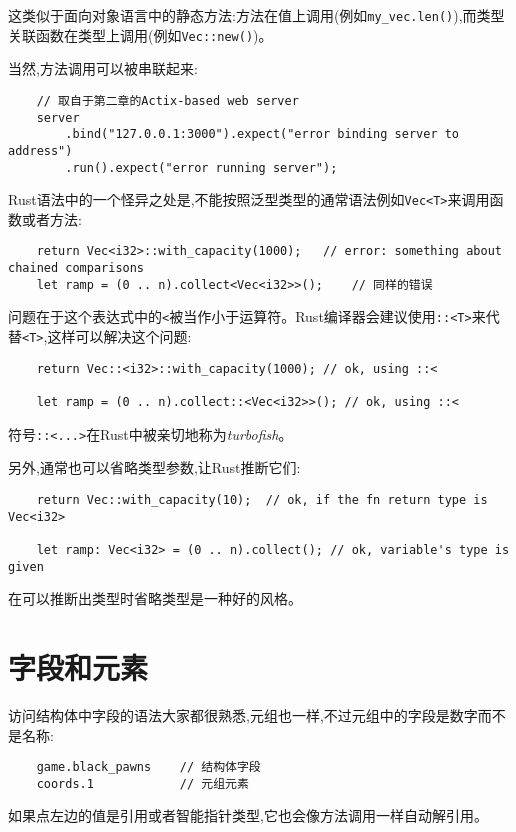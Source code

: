 这类似于面向对象语言中的静态方法:方法在值上调用(例如\texttt{my\_vec.len()}),而类型关联函数在类型上调用(例如\texttt{Vec::new()})。

当然,方法调用可以被串联起来:
\begin{verbatim}
    // 取自于第二章的Actix-based web server
    server
        .bind("127.0.0.1:3000").expect("error binding server to address")
        .run().expect("error running server");
\end{verbatim}

Rust语法中的一个怪异之处是,不能按照泛型类型的通常语法例如\texttt{Vec<T>}来调用函数或者方法:
\begin{verbatim}
    return Vec<i32>::with_capacity(1000);   // error: something about chained comparisons
    let ramp = (0 .. n).collect<Vec<i32>>();    // 同样的错误
\end{verbatim}

问题在于这个表达式中的\texttt{<}被当作小于运算符。Rust编译器会建议使用\texttt{::<T>}来代替\texttt{<T>},这样可以解决这个问题:
\begin{verbatim}
    return Vec::<i32>::with_capacity(1000); // ok, using ::<

    let ramp = (0 .. n).collect::<Vec<i32>>(); // ok, using ::<
\end{verbatim}

符号\texttt{::<...>}在Rust中被亲切地称为\emph{turbofish}。

另外,通常也可以省略类型参数,让Rust推断它们:
\begin{verbatim}
    return Vec::with_capacity(10);  // ok, if the fn return type is Vec<i32>

    let ramp: Vec<i32> = (0 .. n).collect(); // ok, variable's type is given
\end{verbatim}

在可以推断出类型时省略类型是一种好的风格。

\section{字段和元素}\label{field}

访问结构体中字段的语法大家都很熟悉,元组也一样,不过元组中的字段是数字而不是名称:
\begin{verbatim}
    game.black_pawns    // 结构体字段
    coords.1            // 元组元素
\end{verbatim}

如果点左边的值是引用或者智能指针类型,它也会像方法调用一样自动解引用。

